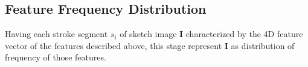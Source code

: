 %


\vspace{-4mm}
\subsection{Feature Frequency Distribution} \label{subsec: featureExtraction}
Having each stroke segment $s_i$ of sketch image $\mathbf{I}$ characterized by the 4D feature vector of the features described above,
this stage represent $\mathbf{I}$ as distribution of frequency of those features.


